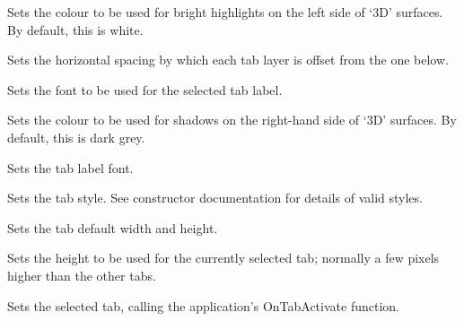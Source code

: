 
Sets the colour to be used for bright highlights on the left side of `3D' surfaces. By default, this is white.



Sets the horizontal spacing by which each tab layer is offset from the one below.



Sets the font to be used for the selected tab label.



Sets the colour to be used for shadows on the right-hand side of `3D' surfaces. By default, this is dark grey.



Sets the tab label font.



Sets the tab style. See constructor documentation for details of valid styles.



Sets the tab default width and height.



Sets the height to be used for the currently selected tab; normally a few pixels
higher than the other tabs.



Sets the selected tab, calling the application's OnTabActivate function.

